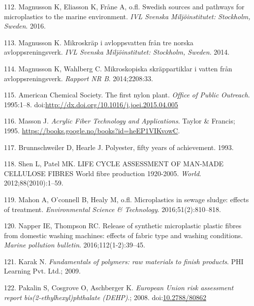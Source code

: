 \documentclass[icelandic,]{book}
\begin{document}
\leavevmode\hypertarget{ref-magnusson2016swedish}{}%
112. Magnusson K, Eliasson K, Fråne A, o.fl. Swedish sources and pathways for microplastics to the marine environment. \emph{IVL Svenska Miljöinstitutet: Stockholm, Sweden}. 2016.

\leavevmode\hypertarget{ref-magnusson2014mikroskrap}{}%
113. Magnusson K. Mikroskräp i avloppsvatten från tre norska avloppsreningsverk. \emph{IVL Svenska Miljöinstitutet: Stockholm, Sweden}. 2014.

\leavevmode\hypertarget{ref-magnusson2014mikroskopiska}{}%
114. Magnusson K, Wahlberg C. Mikroskopiska skräppartiklar i vatten från avloppsreningsverk. \emph{Rapport NR B}. 2014;2208:33.

\leavevmode\hypertarget{ref-AmericanChemicalSociety1995}{}%
115. American Chemical Society. The first nylon plant. \emph{Office of Public Outreach}. 1995:1--8. doi:\href{https://doi.org/http://dx.doi.org/10.1016/j.joei.2015.04.005}{http://dx.doi.org/10.1016/j.joei.2015.04.005}

\leavevmode\hypertarget{ref-masson1995acrylic}{}%
116. Masson J. \emph{Acrylic Fiber Technology and Applications}. Taylor \& Francis; 1995. \url{https://books.google.no/books?id=heEP1VIKvowC}.

\leavevmode\hypertarget{ref-brunnschweiler1993polyester}{}%
117. Brunnschweiler D, Hearle J. Polyester, fifty years of achievement. 1993.

\leavevmode\hypertarget{ref-Shen2012}{}%
118. Shen L, Patel MK. LIFE CYCLE ASSESSMENT OF MAN-MADE CELLULOSE FIBRES World fibre production 1920-2005. \emph{World}. 2012;88(2010):1--59.

\leavevmode\hypertarget{ref-mahon2016microplastics}{}%
119. Mahon A, O'connell B, Healy M, o.fl. Microplastics in sewage sludge: effects of treatment. \emph{Environmental Science \& Technology}. 2016;51(2):810--818.

\leavevmode\hypertarget{ref-napper2016release}{}%
120. Napper IE, Thompson RC. Release of synthetic microplastic plastic fibres from domestic washing machines: effects of fabric type and washing conditions. \emph{Marine pollution bulletin}. 2016;112(1-2):39--45.

\leavevmode\hypertarget{ref-karak2009fundamentals}{}%
121. Karak N. \emph{Fundamentals of polymers: raw materials to finish products}. PHI Learning Pvt. Ltd.; 2009.

\leavevmode\hypertarget{ref-Pakalin2008}{}%
122. Pakalin S, Cosgrove O, Aschberger K. \emph{European Union risk assessment report bis(2-ethylhexyl)phthalate (DEHP)}.; 2008. doi:\href{https://doi.org/10.2788/80862}{10.2788/80862}
\end{document}
